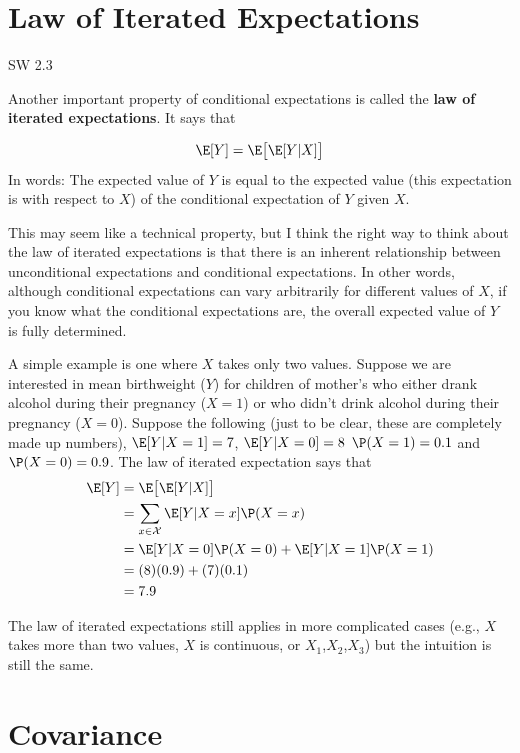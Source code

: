 \documentclass[
  letterpaper,
  DIV=11,
  numbers=noendperiod]{scrreprt}
\begin{document}
\section{Law of Iterated
Expectations}\label{law-of-iterated-expectations}

SW 2.3

Another important property of conditional expectations is called the
\textbf{law of iterated expectations}. It says that

\[
  \E[Y] = \E\big[ \E[Y|X] \big]
\] In words: The expected value of \(Y\) is equal to the expected value
(this expectation is with respect to \(X\)) of the conditional
expectation of \(Y\) given \(X\).

This may seem like a technical property, but I think the right way to
think about the law of iterated expectations is that there is an
inherent relationship between unconditional expectations and conditional
expectations. In other words, although conditional expectations can vary
arbitrarily for different values of \(X\), if you know what the
conditional expectations are, the overall expected value of \(Y\) is
fully determined.

A simple example is one where \(X\) takes only two values. Suppose we
are interested in mean birthweight (\(Y\)) for children of mother's who
either drank alcohol during their pregnancy (\(X=1\)) or who didn't
drink alcohol during their pregnancy (\(X=0\)). Suppose the following
(just to be clear, these are completely made up numbers),
\(\E[Y|X=1] = 7\), \(\E[Y|X=0]=8\) \(\P(X=1) = 0.1\) and
\(\P(X=0)=0.9\). The law of iterated expectation says that \[
  \begin{aligned}
  \E[Y] &= \E\big[ \E[Y|X] \big] \\
  &= \sum_{x \in \mathcal{X}} \E[Y|X=x] \P(X=x) \\
  &= \E[Y|X=0]\P(X=0) + \E[Y|X=1]\P(X=1) \\
  &= (8)(0.9) + (7)(0.1) \\
  &= 7.9
  \end{aligned}
\]

The law of iterated expectations still applies in more complicated cases
(e.g., \(X\) takes more than two values, \(X\) is continuous, or
\(X_1\),\(X_2\),\(X_3\)) but the intuition is still the same.

\section{Covariance}\label{covariance}
\end{document}
